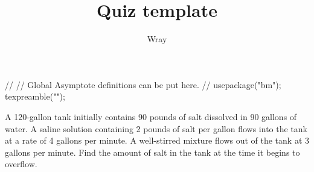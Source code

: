 \documentclass[addpoints, 12pt]{exam}
\title{Quiz template}
\author{Wray}
\begin{document}
\begin{asydef}
//
// Global Asymptote definitions can be put here.
//
usepackage("bm");
texpreamble("\def\V#1{\bm{#1}}");
\end{asydef}



\bigskip

             
\bigskip
\bigskip
\smallskip

A 120-gallon tank initially contains 90 pounds of salt dissolved in 90 gallons of water.  A saline solution containing 2 pounds of salt per gallon flows into the tank at a rate of 4 gallons per minute.  A well-stirred mixture flows out of the tank at 3 gallons per minute.  Find the amount of salt in the tank at the time it begins to overflow.
\end{document}
